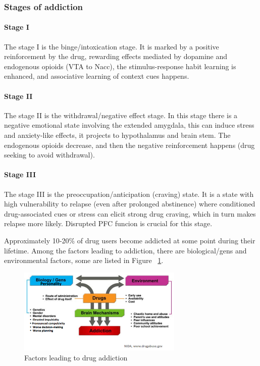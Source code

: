 \documentclass[12pt,article,oneside,a4paper]{memoir}
\begin{document}
\subsubsection{Stages of addiction}

\paragraph{Stage I}
The stage I is the binge/intoxication stage. It is marked by a positive reinforcement by the drug, rewarding effects mediated by dopamine and endogenous opioids (VTA to Nacc), the stimulus-response habit learning is enhanced, and associative learning of context cues happens.

\paragraph{Stage II}
The stage II is the withdrawal/negative effect stage. In this stage there is a negative emotional state involving the extended amygdala, this can induce stress and anxiety-like effects, it projects to hypothalamus and brain stem. The endogenous opioids decrease, and then the negative reinforcement happens (drug seeking to avoid withdrawal).

\paragraph{Stage III}
The stage III is the preoccupation/anticipation (craving) state. It is a state with high vulnerability to relapse (even after prolonged abstinence) where conditioned drug-associated cues or stress can elicit strong drug craving, which in turn makes relapse more likely. Disrupted PFC funcion is crucial for this stage.

Approximately 10‐20\% of drug users become addicted at some point during their lifetime. Among the factors leading to addiction, there are biological/gens and environmental factors, some are listed in Figure ~\ref{fig:drug-addiction-factors}.

\begin{figure}
  \centering
  \includegraphics[width=0.7\textwidth]{imgs/drug-addiction-factors.png}
  \caption{Factors leading to drug addiction}
  \label{fig:drug-addiction-factors}
\end{figure}
\end{document}
